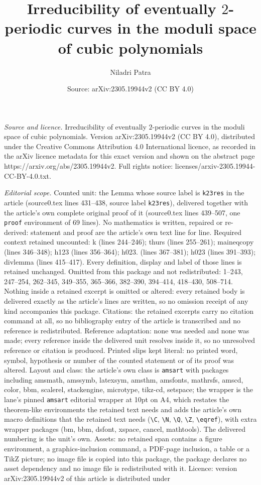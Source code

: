 \documentclass[10pt,a4paper]{amsart}
\title[Irreducibility of eventually $2$-periodic curves in the modu]{Irreducibility of eventually $2$-periodic curves in the moduli space of cubic polynomials}
\author{Niladri Patra}
\date{Source: arXiv:2305.19944v2 (CC BY 4.0)}
\begin{document}
\maketitle

\noindent\emph{Source and licence.} Irreducibility of eventually $2$-periodic curves in the moduli space of cubic polynomials. Version arXiv:2305.19944v2 (CC BY 4.0), distributed under the Creative Commons Attribution 4.0 International licence, as recorded in the arXiv licence metadata for this exact version and shown on the abstract page https://arxiv.org/abs/2305.19944v2. Full rights notice: licenses/arxiv-2305.19944-CC-BY-4.0.txt.\par\smallskip

\noindent\textit{Editorial scope.} Counted unit: the Lemma whose source label is \texttt{k23res} in the article (source0.tex lines 431--438, source label \texttt{k23res}), delivered together with the article's own complete original proof of it (source0.tex lines 439--507, one \texttt{proof} environment of 69 lines). No mathematics is written, repaired or re-derived: statement and proof are the article's own text line for line. Required context retained uncounted: k (lines 244--246); thurs (lines 255--261); maineqcopy (lines 346--348); h123 (lines 356--364); h023. (lines 367--381); h023 (lines 391--393); divlemma (lines 415--417). Every definition, display and label of those lines is retained unchanged. Omitted from this package and not redistributed: 1--243, 247--254, 262--345, 349--355, 365--366, 382--390, 394--414, 418--430, 508--714. Nothing inside a retained excerpt is omitted or altered: every retained body is delivered exactly as the article's lines are written, so no omission receipt of any kind accompanies this package. Citations: the retained excerpts carry no citation command at all, so no bibliography entry of the article is transcribed and no reference is redistributed. Reference adaptation: none was needed and none was made; every reference inside the delivered unit resolves inside it, so no unresolved reference or citation is produced. Printed slips kept literal: no printed word, symbol, hypothesis or number of the counted statement or of its proof was altered. Layout and class: the article's own class is \texttt{amsart} with packages including amsmath, amssymb, latexsym, amsthm, amsfonts, mathrsfs, amscd, color, bbm, scalerel, stackengine, microtype, tikz-cd, setspace; the wrapper is the lane's pinned \texttt{amsart} editorial wrapper at 10pt on A4, which restates the theorem-like environments the retained text needs and adds the article's own macro definitions that the retained text needs (\texttt{\textbackslash C}, \texttt{\textbackslash N}, \texttt{\textbackslash Q}, \texttt{\textbackslash Z}, \texttt{\textbackslash eqref}), with extra wrapper packages (bm, bbm, dsfont, xspace, cancel, mathtools). The delivered numbering is the unit's own. Assets: no retained span contains a figure environment, a graphics-inclusion command, a PDF-page inclusion, a table or a TikZ picture; no image file is copied into this package, the package declares no asset dependency and no image file is redistributed with it. Licence: version arXiv:2305.19944v2 of this article is distributed under 
\end{document}
